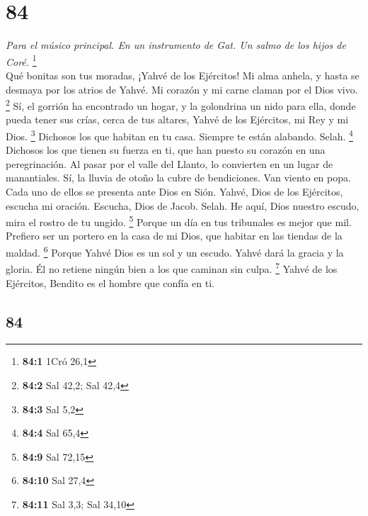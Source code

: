 \begin{paracol}{2}
\hypertarget{section-166}{%
\section{84}\label{section-166}}

\emph{Para el músico principal. En un instrumento de Gat. Un salmo de
los hijos de Coré.} \footnote{\textbf{84:1} 1Cró 26,1}\\
 Qué bonitas son tus moradas, ¡Yahvé de los Ejércitos!
 Mi alma anhela, y hasta se desmaya por los atrios de
Yahvé. Mi corazón y mi carne claman por el Dios vivo. \footnote{\textbf{84:2}
  Sal 42,2; Sal 42,4}  Sí, el gorrión ha encontrado un
hogar, y la golondrina un nido para ella, donde pueda tener sus crías,
cerca de tus altares, Yahvé de los Ejércitos, mi Rey y mi Dios.
\footnote{\textbf{84:3} Sal 5,2}  Dichosos los que habitan
en tu casa. Siempre te están alabando. Selah. \footnote{\textbf{84:4}
  Sal 65,4}  Dichosos los que tienen su fuerza en ti, que
han puesto su corazón en una peregrinación.  Al pasar por
el valle del Llanto, lo convierten en un lugar de manantiales. Sí, la
lluvia de otoño la cubre de bendiciones.  Van viento en
popa. Cada uno de ellos se presenta ante Dios en Sión. 
Yahvé, Dios de los Ejércitos, escucha mi oración. Escucha, Dios de
Jacob. Selah.  He aquí, Dios nuestro escudo, mira el
rostro de tu ungido. \footnote{\textbf{84:9} Sal 72,15} 
Porque un día en tus tribunales es mejor que mil. Prefiero ser un
portero en la casa de mi Dios, que habitar en las tiendas de la maldad.
\footnote{\textbf{84:10} Sal 27,4}  Porque Yahvé Dios es
un sol y un escudo. Yahvé dará la gracia y la gloria. Él no retiene
ningún bien a los que caminan sin culpa. \footnote{\textbf{84:11} Sal
  3,3; Sal 34,10}  Yahvé de los Ejércitos, Bendito es el
hombre que confía en ti.

\switchcolumn
\begin{otherlanguage}{english}

\hypertarget{section-167}{%
\section{84}\label{section-167}}


\end{otherlanguage}
\end{paracol}
